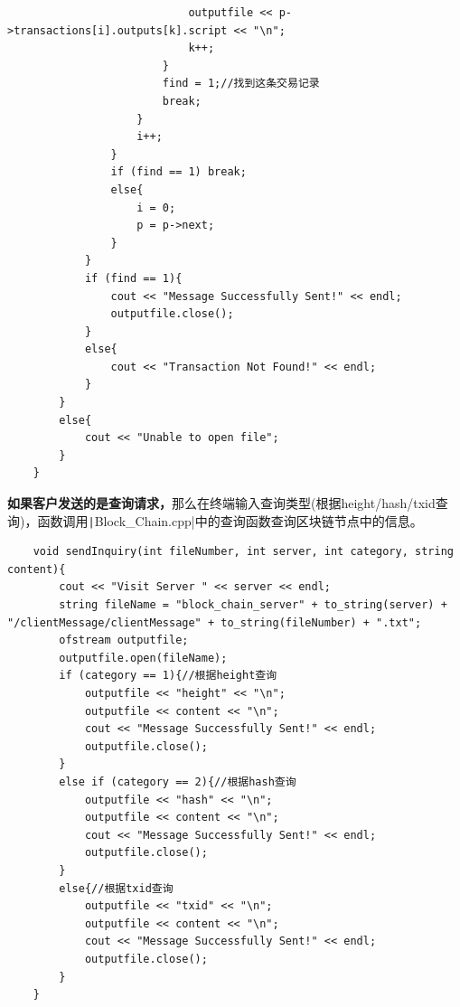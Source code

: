 \documentclass[10pt,a4paper]{article}
\begin{document}
\begin{verbatim}
                            outputfile << p->transactions[i].outputs[k].script << "\n";
                            k++;
                        }                
                        find = 1;//找到这条交易记录
                        break;
                    }
                    i++;
                }
                if (find == 1) break;
                else{
                    i = 0;
                    p = p->next;
                }
            }
            if (find == 1){
                cout << "Message Successfully Sent!" << endl;
                outputfile.close();
            }
            else{
                cout << "Transaction Not Found!" << endl;
            }
        }
        else{
            cout << "Unable to open file";
        }
    }
    \end{verbatim}
    \noindent \textbf{如果客户发送的是查询请求，}那么在终端输入查询类型(根据height/hash/txid查询)，函数调用\texttt|Block_Chain.cpp|中的查询函数查询区块链节点中的信息。
    \begin{verbatim}
    void sendInquiry(int fileNumber, int server, int category, string content){
        cout << "Visit Server " << server << endl;
        string fileName = "block_chain_server" + to_string(server) + "/clientMessage/clientMessage" + to_string(fileNumber) + ".txt";
        ofstream outputfile;
        outputfile.open(fileName);
        if (category == 1){//根据height查询
            outputfile << "height" << "\n";
            outputfile << content << "\n";
            cout << "Message Successfully Sent!" << endl;
            outputfile.close();
        }
        else if (category == 2){//根据hash查询
            outputfile << "hash" << "\n";
            outputfile << content << "\n";
            cout << "Message Successfully Sent!" << endl;
            outputfile.close();
        }
        else{//根据txid查询
            outputfile << "txid" << "\n";
            outputfile << content << "\n";
            cout << "Message Successfully Sent!" << endl;
            outputfile.close();
        }
    }
    \end{verbatim}
\end{document}
